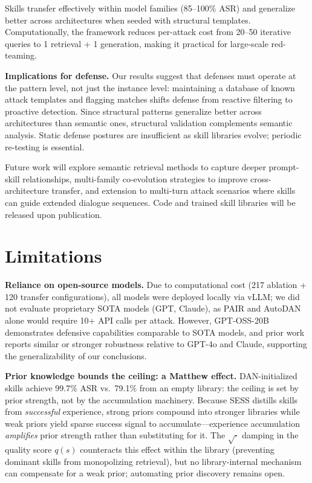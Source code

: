 \documentclass{article} %
\begin{document}
Skills transfer effectively within model families (85--100\% ASR) and generalize better across architectures when seeded with structural templates. Computationally, the framework reduces per-attack cost from 20--50 iterative queries to 1 retrieval + 1 generation, making it practical for large-scale red-teaming.

\textbf{Implications for defense.} Our results suggest that defenses must operate at the pattern level, not just the instance level: maintaining a database of known attack templates and flagging matches shifts defense from reactive filtering to proactive detection. Since structural patterns generalize better across architectures than semantic ones, structural validation complements semantic analysis. Static defense postures are insufficient as skill libraries evolve; periodic re-testing is essential.

Future work will explore semantic retrieval methods to capture deeper prompt-skill relationships, multi-family co-evolution strategies to improve cross-architecture transfer, and extension to multi-turn attack scenarios where skills can guide extended dialogue sequences. Code and trained skill libraries will be released upon publication.

\section{Limitations}

\textbf{Reliance on open-source models.} Due to computational cost (217 ablation + 120 transfer configurations), all models were deployed locally via vLLM; we did not evaluate proprietary SOTA models (GPT, Claude), as PAIR and AutoDAN alone would require 10+ API calls per attack. However, GPT-OSS-20B demonstrates defensive capabilities comparable to SOTA models, and prior work~\citep{belaire2025automatic,wei2025learning} reports similar or stronger robustness relative to GPT-4o and Claude, supporting the generalizability of our conclusions.

\textbf{Prior knowledge bounds the ceiling: a Matthew effect.} DAN-initialized skills achieve 99.7\% ASR vs.\ 79.1\% from an empty library: the ceiling is set by prior strength, not by the accumulation machinery. Because SESS distills skills from \emph{successful} experience, strong priors compound into stronger libraries while weak priors yield sparse success signal to accumulate---experience accumulation \emph{amplifies} prior strength rather than substituting for it. The $\sqrt{\cdot}$ damping in the quality score $q(s)$ counteracts this effect within the library (preventing dominant skills from monopolizing retrieval), but no library-internal mechanism can compensate for a weak prior; automating prior discovery remains open.
\end{document}
